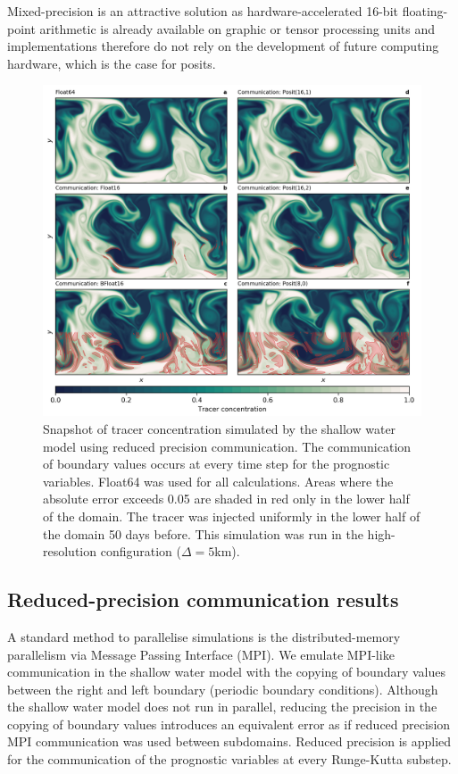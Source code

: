 Mixed-precision is an attractive solution as hardware-accelerated 16-bit
floating-point arithmetic is already available on graphic or tensor processing
units and implementations therefore do not rely on the development of future
computing hardware, which is the case for posits.

\begin{figure}
\includegraphics[width=1\textwidth]{Figures/swm/snapshot_comm.png}
\caption{Snapshot of tracer concentration simulated by the shallow water model
using reduced precision communication. The communication of boundary values occurs
at every time step for the prognostic variables. Float64 was used for all calculations.
Areas where the absolute error exceeds 0.05 are shaded in red only in the lower
half of the domain. The tracer was injected uniformly in the lower half of the
domain 50 days before. This simulation was run in the high-resolution
configuration ($\Delta = 5$km).}
\label{fig:snapshot_comm}
\end{figure}

\subsection{Reduced-precision communication results}
\label{sec:swm_results_comm}

A standard method to parallelise simulations is the distributed-memory parallelism
via Message Passing Interface (MPI). We emulate MPI-like communication in the
shallow water model with the copying of boundary values between the right and
left boundary (periodic boundary conditions). Although the shallow water model
does not run in parallel, reducing the precision in the copying of boundary values
introduces an equivalent error as if reduced precision MPI communication was used
between subdomains. Reduced precision is applied for the communication of the
prognostic variables at every Runge-Kutta substep.

